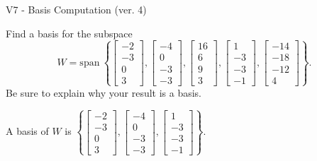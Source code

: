 \begin{exercise}
  \begin{exerciseTitle}V7 - Basis Computation (ver. 4)\end{exerciseTitle}
  \begin{exerciseStatement}
    Find a basis for the subspace 
\[W=\mathrm{span}\ \left\{\left[\begin{array}{r}
-2 \\
-3 \\
0 \\
3
\end{array}\right] , \left[\begin{array}{r}
-4 \\
0 \\
-3 \\
-3
\end{array}\right] , \left[\begin{array}{r}
16 \\
6 \\
9 \\
3
\end{array}\right] , \left[\begin{array}{r}
1 \\
-3 \\
-3 \\
-1
\end{array}\right] , \left[\begin{array}{r}
-14 \\
-18 \\
-12 \\
4
\end{array}\right]\right\}.\]
 Be sure to explain why your result is a basis.


  \end{exerciseStatement}
  \begin{exerciseAnswer}
   A basis of \(W\) is  \(\left\{\left[\begin{array}{r}
-2 \\
-3 \\
0 \\
3
\end{array}\right] , \left[\begin{array}{r}
-4 \\
0 \\
-3 \\
-3
\end{array}\right] , \left[\begin{array}{r}
1 \\
-3 \\
-3 \\
-1
\end{array}\right]\right\}\).
  


  \end{exerciseAnswer}
\end{exercise}